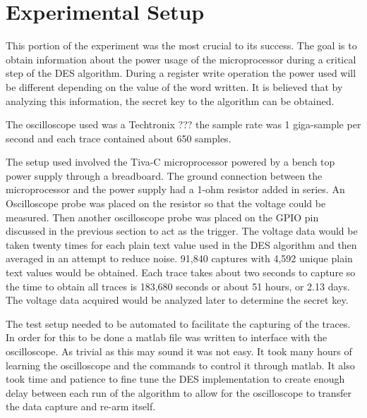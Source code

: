 	

\section{Experimental Setup} \label{sec::expr}
	This portion of the experiment was the most crucial to its success.  The goal is to obtain information about the power usage of the microprocessor during a critical step of the DES algorithm.  During a register write operation the power used will be different depending on the value of the word written.  It is believed that by analyzing this information, the secret key to the algorithm can be obtained.
	
	The oscilloscope used was a Techtronix ??? the sample rate was 1 giga-sample per second and each trace contained about 650 samples.
	
	The setup used involved the Tiva-C microprocessor powered by a bench top power supply through a breadboard.  The ground connection between the microprocessor and the power supply had a 1-ohm resistor added in series.  An Oscilloscope probe was placed on the resistor so that the voltage could be measured.  Then another oscilloscope probe was placed on the GPIO pin discussed in the previous section to act as the trigger.  The voltage data would be taken twenty times for each plain text value used in the DES algorithm and then averaged in an attempt to reduce noise.  91,840 captures with 4,592 unique plain text values would be obtained.  Each trace takes about two seconds to capture so the time to obtain all traces is 183,680 seconds or about 51 hours, or 2.13 days.  The voltage data acquired would be analyzed later to determine the secret key.
	
	The test setup needed to be automated to facilitate the capturing of the traces.  In order for this to be done a matlab file was written to interface with the oscilloscope.  As trivial as this may sound it was not easy.  It took many hours of learning the oscilloscope and the commands to control it through matlab.  It also took time and patience to fine tune the DES implementation to create enough delay between each run of the algorithm to allow for the oscilloscope to transfer the data capture and re-arm itself.
	

